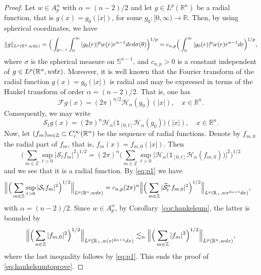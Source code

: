 \documentclass[10pt,a4paper]{amsart}
\newcommand{\RR}{\mathbb{R}}
\newcommand{\ZZ}{\mathbb{Z}}
\newcommand{\calF}{\mathcal{F}}
\newcommand{\calH}{\mathcal{H}}
\newcommand{\calS}{\mathcal{S}}
\begin{document}
\begin{proof}
Let $w\in A_p^\alpha$ with $\alpha=(n-2)/2$ and let $g\in L^p(\RR^n)$ be a radial function, that is $g(x)=g_0(|x|)$, for some $g_0\colon[0,\infty)\to\RR$. Then, by using spherical coordinates, we have
\begin{equation}\label{eq:p1}
    \|g\|_{L^p(\RR^n,w{\rm d}x)}=\Big(\int_{\mathbb{S}^{n-1}}\int_{0}^\infty|g_0(r)|^p w(r)r^{n-1}{\rm d}r{\rm d}\sigma(\theta)\Big)^{1/p}=c_{n,p}\Big(\int_{0}^\infty|g_0(r)|^p w(r)r^{n-1}{\rm d}r\Big)^{1/p},
\end{equation}
where $\sigma$ is the spherical measure on $\mathbb{S}^{n-1}$, and $c_{n,p}>0$ is a constant independent of $g\in L^p(\RR^n, w{\rm d}x)$. Moreover, it is well known that the Fourier transform of the radial function $g(x)=g_0(|x|)$ is radial and may be expressed in terms of the Hankel transform of order $\alpha=(n-2)/2$. That is, one has
\begin{equation*}
    \calF g(x)=(2\pi)^{n/2}\calH_{\alpha}(g_0)(|x|),\quad x\in\RR^n.
\end{equation*}
Consequently, we may write
\begin{equation*}
    \calS_t g(x)=(2\pi)^n\calH_\alpha\big(\mathds{1}_{[0,t]}\calH_\alpha( g_0)\big)(|x|),\quad x\in\RR^n.
\end{equation*}
Now, let $(f_m)_{m\in\ZZ}\subset C_{\rm c}^\infty(\RR^n)$ be the sequence of radial functions. Denote by $f_{m,0}$ the radial part of $f_m$, that is, $f_m(x)=f_{m,0}(|x|)$. Then
\begin{equation*}
    \Big(\sum_{m\in\ZZ}\sup_{t>0} |\calS_t f_m|^2\Big)^{1/2}=(2\pi)^n\Big(\sum_{m\in\ZZ}\sup_{t>0} \big|\calH_\alpha\big(\mathds{1}_{[0,t]}\calH_\alpha( f_{m,0})\big)\big|^2\Big)^{1/2}
\end{equation*}
and we see that it is a radial function. By \eqref{eq:p1} we have 
\begin{align*}
    \Big\|\Big(\sum_{m\in\ZZ}\sup_{t>0} |\calS_t f_m|^2\Big)^{1/2}\Big\|_{L^p(\RR^n,w{\rm d}x)}&=c_{n,p}(2\pi)^n\Big\|\Big(\sum_{m\in\ZZ}|\widetilde{\calS}_{t}^\alpha f_{m,0}|^2\Big)^{1/2}\Big\|_{L^p(\RR_+,wx^{2\alpha+1}{\rm d}x)},
\end{align*}
with $\alpha=(n-2)/2$. Since $w\in A_p^\alpha$, by Corollary~\ref{cor:hankelsum}, the latter is bounded by
\begin{equation*}
\Big\|\Big(\sum_{n\in\ZZ}|f_{m,0}|^2\Big)^{1/2}\Big\|_{L^p(\RR_+,w|x|^{2\alpha+1}{\rm d}x)}\lesssim_n\Big\|\Big(\sum_{m\in\ZZ}|f_m|^2\Big)^{1/2}\Big\|_{L^p(\RR^n,w{\rm d}x)},
\end{equation*}
where the last inequality follows by \eqref{eq:p1}. This ends the proof of \eqref{eq:hankelsumtoprove}.
\end{proof}
\end{document}
